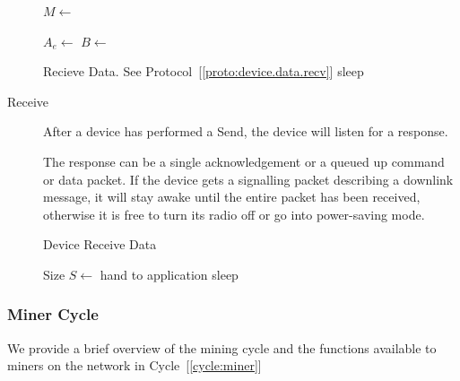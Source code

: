 \documentclass[letterpaper,11pt]{article}
\begin{document}
\begin{description}
\begin{algorithm}[!htb]
       {
        $M \leftarrow $  \;
         \;
        \BlankLine

        $A_e \leftarrow $  \;
        $B \leftarrow $  \;
         \;
        \BlankLine

         {
           {
            Recieve Data. See Protocol~[\ref{proto:device.data.recv}]
          }
           {sleep}
        }
      }
    \end{algorithm}
    \FloatBarrier

  \item [Receive] After a device has performed a Send, the device will listen for a response.

    The response can be a single acknowledgement or a queued up command or data packet. If the device gets a signalling packet describing a downlink message, it will stay awake until the entire packet has been received, otherwise it is free to turn its radio off or go into power-saving mode.

    \begin{algorithm}[!htb]
      \DontPrintSemicolon
      \caption{Device Receive Data}\label{proto:device.data.recv}

       {
        Size $S \leftarrow $  \;
         {
           {hand to application}
           {sleep}
        }
      }
    \end{algorithm}
    \FloatBarrier

\end{description}


\subsubsection{Miner Cycle}\label{mining}

We provide a brief overview of the mining cycle and the functions available to miners on the network in Cycle~[\ref{cycle:miner}]
\end{document}
